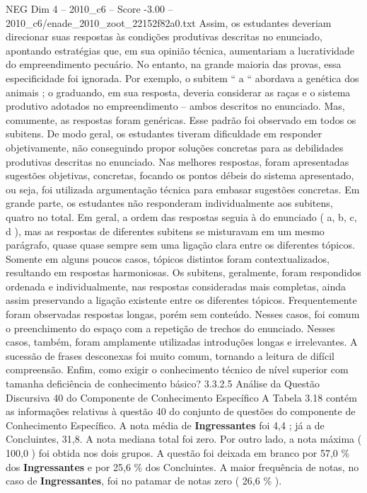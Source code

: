 \begin{textsample}{NEG Dim 4 – 2010\_c6 – Score -3.00 – 2010\_c6/enade\_2010\_zoot\_22152f82a0.txt}
Assim, os estudantes deveriam direcionar suas respostas às condições produtivas descritas no enunciado, apontando estratégias que, em sua opinião técnica, aumentariam a lucratividade do empreendimento pecuário.
No entanto, na grande maioria das provas, essa especificidade foi ignorada.
Por exemplo, o subitem “ a “ abordava a genética dos animais ; o graduando, em sua resposta, deveria considerar as raças e o sistema produtivo adotados no empreendimento – ambos descritos no enunciado.
Mas, comumente, as respostas foram genéricas.
Esse padrão foi observado em todos os subitens.
De modo geral, os estudantes tiveram dificuldade em responder objetivamente, não conseguindo propor soluções concretas para as debilidades produtivas descritas no enunciado.
Nas melhores respostas, foram apresentadas sugestões objetivas, concretas, focando os pontos débeis do sistema apresentado, ou seja, foi utilizada argumentação técnica para embasar sugestões concretas.
Em grande parte, os estudantes não responderam individualmente aos subitens, quatro no total.
Em geral, a ordem das respostas seguia à do enunciado ( a, b, c, d ), mas as respostas de diferentes subitens se misturavam em um mesmo parágrafo, quase quase sempre sem uma ligação clara entre os diferentes tópicos.
Somente em alguns poucos casos, tópicos distintos foram contextualizados, resultando em respostas harmoniosas.
Os subitens, geralmente, foram respondidos ordenada e individualmente, nas respostas consideradas mais completas, ainda assim preservando a ligação existente entre os diferentes tópicos.
Frequentemente foram observadas respostas longas, porém sem conteúdo.
Nesses casos, foi comum o preenchimento do espaço com a repetição de trechos do enunciado.
Nesses casos, também, foram amplamente utilizadas introduções longas e irrelevantes.
A sucessão de frases desconexas foi muito comum, tornando a leitura de difícil compreensão.
Enfim, como exigir o conhecimento técnico de nível superior com tamanha deficiência de conhecimento básico? 3.3.2.5 Análise da Questão Discursiva 40 do Componente de Conhecimento Específico A Tabela 3.18 contém as informações relativas à questão 40 do conjunto de questões do componente de Conhecimento Específico.
A nota média de \textbf{Ingressantes} foi 4,4 ; já a de Concluintes, 31,8.
A nota mediana total foi zero.
Por outro lado, a nota máxima ( 100,0 ) foi obtida nos dois grupos.
A questão foi deixada em branco por 57,0 \% dos \textbf{Ingressantes} e por 25,6 \% dos Concluintes.
A maior frequência de notas, no caso de \textbf{Ingressantes}, foi no patamar de notas zero ( 26,6 \% ).

\end{textsample}
